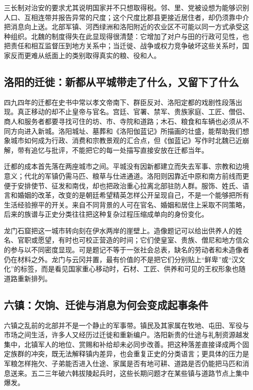 三长制对治安的要求尤其说明国家并不只想取得税。邻、里、党被设想为能够识别人口、互相连带并报告异常的尺度；这个尺度比郡县更接近居住者，却仍须靠中介把消息向上送。北部军镇、河西绿洲和洛阳附近的农业区不可能以同一方式承受这种组织。北魏的制度得失在此显现得很清楚：它增加了对户与田的行政可见性，也把责任和相互监督压到地方关系中；当迁徙、战争或权力竞争破坏这些关系时，国家反而更难从纸面上的类别取得真实的粮、役和人。

\subsection{洛阳的迁徙：新都从平城带走了什么，又留下了什么}

四九四年的迁都在史书中常以孝文帝南下、群臣反对、洛阳定都的戏剧性段落出现。真正移动的却不止皇帝与官名。宫廷、官署、禁军、贵族家庭、工匠、僧侣、商人和服务者都要寻找可住的坊、市、寺院和道路；木石、粮食和车辆也必须从不同方向进入新城。洛阳城址、墓葬和《洛阳伽蓝记》所描画的壮盛，能帮助我们想象城市如何成为行政、消费和宗教景观的汇合点，但《伽蓝记》写作时北魏已近崩解，带有追忆与批评，不能把它的每一处描写直接安放在迁都当年。

迁都的成本首先落在两座城市之间。平城没有因新都建立而失去军事、宗教和边境意义；代北的军镇仍需马匹、粮草与仕进通道。洛阳则因靠近中原和南方前线而更便于安排使节、征发和南伐，却也把政治重心拉离北部驻防人群。服饰、姓氏、语言和婚姻的改革，改变的是朝廷希望精英怎样公开呈现自己，不是一个能够把所有生活经验擦平的开关。来自不同背景的人可在官名、婚姻和居住上采取不同策略，后来的族谱与正史分类往往把这种复杂过程压缩成单向的身份变化。

龙门石窟把这一城市转向刻在伊水两岸的崖壁上。造像题记可以给出供养人的姓名、官职或愿望，有时也可校正营造的时间；它们使皇室、贵族、僧尼和地方信众的参与以不同密度显现。可是题记不等于一张社会总表，缺名的劳动者和未造像者仍在材料之外。龙门与云冈并置，最有价值的不是把它们分别贴上“鲜卑”或“汉文化”的标签，而是看见国家重心移动时，石材、工匠、供养和可见的王权形象也随道路重新排列。

\subsection{六镇：欠饷、迁徙与消息为何会变成起事条件}

六镇之乱前的北部并不是一个静止的军事带。镇民及其家属在牧地、屯田、军役与市场之间生活，许多人又经历过迁徙和重新编户。洛阳新贵的仕途与礼制资源越发集中，北镇军人的地位、赏赐和补给却未必同步改善。把这种落差直接译成两个固定族群的冲突，既无法解释镇内差异，也会重复正史的分类语言；更具体的压力是军粮怎样拖欠、子弟能否进入仕途、家属是否有地可耕、道路是否仍能把马匹和消息送来。五二三年破六韩拔陵起兵时，这些长期问题才在某些镇与道路节点上集中爆发。

